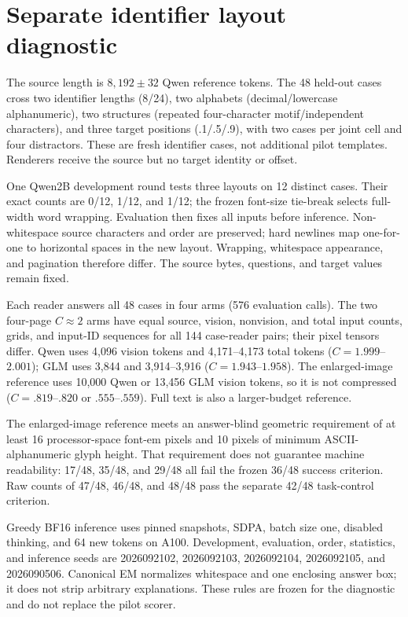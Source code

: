 \documentclass{article}
\begin{document}
\section{Separate identifier layout diagnostic}
\label{app:layout}

The source length is $8,192\pm32$ Qwen reference tokens. The 48 held-out cases cross two identifier lengths (8/24), two alphabets (decimal/lowercase alphanumeric), two structures (repeated four-character motif/independent characters), and three target positions (.1/.5/.9), with two cases per joint cell and four distractors. These are fresh identifier cases, not additional pilot templates. Renderers receive the source but no target identity or offset.

One Qwen2B development round tests three layouts on 12 distinct cases. Their exact counts are 0/12, 1/12, and 1/12; the frozen font-size tie-break selects full-width word wrapping. Evaluation then fixes all inputs before inference. Non-whitespace source characters and order are preserved; hard newlines map one-for-one to horizontal spaces in the new layout. Wrapping, whitespace appearance, and pagination therefore differ. The source bytes, questions, and target values remain fixed.

Each reader answers all 48 cases in four arms (576 evaluation calls). The two four-page $C\approx2$ arms have equal source, vision, nonvision, and total input counts, grids, and input-ID sequences for all 144 case-reader pairs; their pixel tensors differ. Qwen uses 4,096 vision tokens and 4,171--4,173 total tokens ($C=1.999$--$2.001$); GLM uses 3,844 and 3,914--3,916 ($C=1.943$--$1.958$). The enlarged-image reference uses 10,000 Qwen or 13,456 GLM vision tokens, so it is not compressed ($C=.819$--$.820$ or $.555$--$.559$). Full text is also a larger-budget reference.

The enlarged-image reference meets an answer-blind geometric requirement of at least 16 processor-space font-em pixels and 10 pixels of minimum ASCII-alphanumeric glyph height. That requirement does not guarantee machine readability: 17/48, 35/48, and 29/48 all fail the frozen 36/48 success criterion. Raw counts of 47/48, 46/48, and 48/48 pass the separate 42/48 task-control criterion.

Greedy BF16 inference uses pinned snapshots, SDPA, batch size one, disabled thinking, and 64 new tokens on A100. Development, evaluation, order, statistics, and inference seeds are 2026092102, 2026092103, 2026092104, 2026092105, and 2026090506. Canonical EM normalizes whitespace and one enclosing answer box; it does not strip arbitrary explanations. These rules are frozen for the diagnostic and do not replace the pilot scorer.
\end{document}
